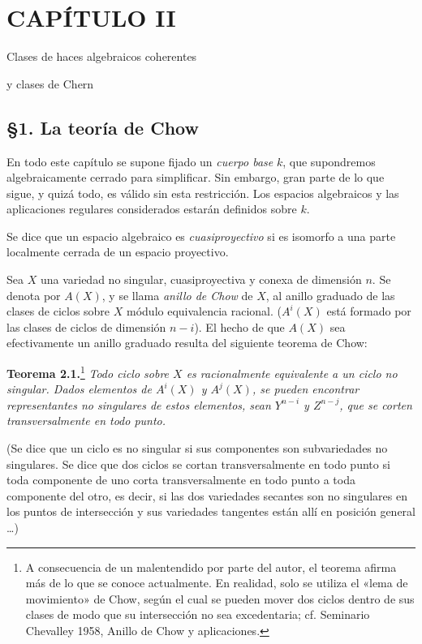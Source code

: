 \providecommand{\sisi}[2]{#2}

\section*{CAPÍTULO II}
\begin{center}
Clases de haces algebraicos coherentes\par
y clases de Chern
\end{center}

\subsection*{\S 1. La teoría de Chow}

En todo este capítulo se supone fijado un \emph{cuerpo base} $k$, que supondremos algebraicamente cerrado para simplificar. Sin embargo, gran parte de lo que sigue, y quizá todo, es válido sin esta restricción. Los espacios algebraicos y las aplicaciones regulares considerados estarán definidos sobre $k$.

Se dice que un espacio algebraico es \emph{cuasiproyectivo} si es isomorfo a una parte localmente cerrada de un espacio proyectivo.

Sea $X$ una variedad no singular, cuasiproyectiva y conexa de dimensión $n$. Se denota por $A(X)$, y se llama \emph{anillo de Chow} de $X$, al anillo graduado de las clases de ciclos sobre $X$ módulo equivalencia racional. ($A^i(X)$ está formado por las clases de ciclos de dimensión $n-i$). El hecho de que $A(X)$ sea efectivamente un anillo graduado resulta del siguiente teorema de Chow:

\textbf{Teorema 2.1.}\footnote{A consecuencia de un malentendido por parte del autor, el teorema afirma más de lo que se conoce actualmente. En realidad, solo se utiliza el «lema de movimiento» de Chow, según el cual se pueden mover dos ciclos dentro de sus clases de modo que su intersección no sea excedentaria; cf. Seminario Chevalley 1958, Anillo de Chow y aplicaciones.} \emph{Todo ciclo sobre $X$ es racionalmente equivalente a un ciclo no singular. Dados elementos de $A^i(X)$ y $A^j(X)$, se pueden encontrar representantes no singulares de estos elementos, sean $Y^{n-i}$ y $Z^{n-j}$, que se corten transversalmente en todo punto.}

(Se dice que un ciclo es no singular si sus componentes son subvariedades no singulares. Se dice que dos ciclos se cortan transversalmente en todo punto si toda componente de uno corta transversalmente en todo punto a toda componente del otro, es decir, si las dos variedades secantes son no singulares en los puntos de intersección y sus variedades tangentes están allí en posición general \dots)

